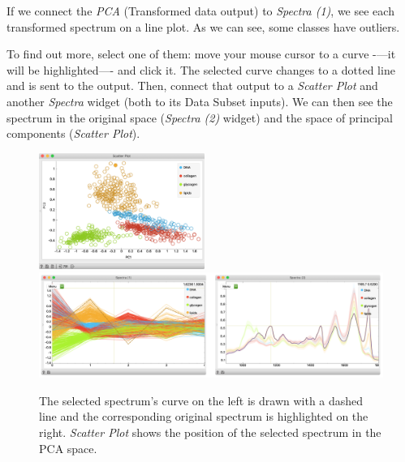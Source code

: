 If we connect the \textit{PCA} (Transformed data output) to \textit{Spectra (1)}, we see each transformed spectrum on a line plot. As we can see, some classes have outliers. 

To find out more, select one of them: move your mouse cursor to a curve -—it will be highlighted—- and click it. The selected curve changes to a dotted line and is sent to the output. Then, connect that output to a \textit{Scatter Plot} and another \textit{Spectra} widget (both to its Data Subset inputs). We can then see the spectrum in the original space (\textit{Spectra (2)} widget) and the space of principal components (\textit{Scatter Plot}).

\begin{figure}[h]
  \vspace{3cm}
  {\includegraphics[width=0.48\textwidth]{graphics/ch-spectral_PCA/spectral_PCA-fig6.png}}
  {\includegraphics[width=\textwidth]{graphics/ch-spectral_PCA/spectral_PCA-fig5.png}}
  \vspace{-3.5cm}
  \caption{The selected spectrum's curve on the left is drawn with a dashed line and the corresponding original spectrum is highlighted on the right. \textit{Scatter Plot} shows the position of the selected spectrum in the PCA space.}
  \label{fig:spectral-PCA-fig5}
\end{figure}
